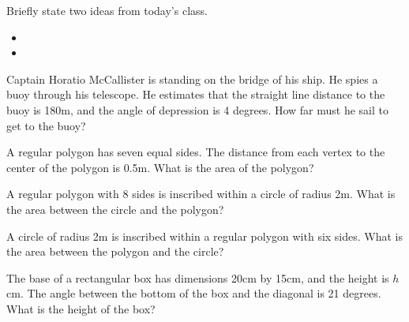 \begin{problem}
\item Briefly state two ideas from today's class.
  \begin{itemize}
  \item
  \item
  \end{itemize}
\item Captain Horatio McCallister is standing on the bridge of his
  ship. He spies a buoy through his telescope. He estimates that the
  straight line distance to the buoy is 180m, and the angle of
  depression is 4 degrees. How far must he sail to get to the buoy?
\item A regular polygon has seven equal sides. The distance from each
  vertex to the center of the polygon is 0.5m. What is the area of the
  polygon?
\item A regular polygon with 8 sides is inscribed within a circle of
  radius 2m. What is the area between the circle and the polygon?
\item A circle of radius 2m is inscribed within a regular polygon with
  six sides. What is the area between the polygon and the circle?
\item The base of a rectangular box has dimensions 20cm by 15cm, and
  the height is $h$ cm. The angle between the bottom of the box and
  the diagonal is 21 degrees. What is the height of the box?
\end{problem}


